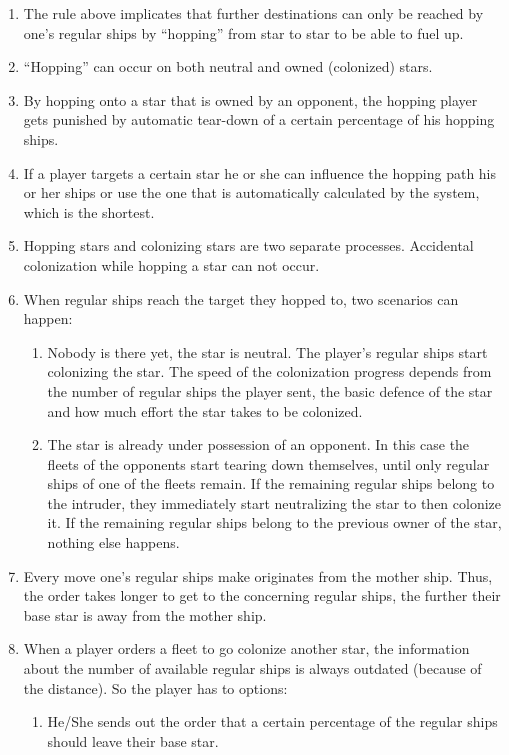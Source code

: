 \begin{enumerate}
	\item The rule above implicates	that further destinations can only be reached by one's regular ships by ``hopping'' from star to star to be able to fuel up.
	\item ``Hopping'' can occur on both neutral and owned (colonized) stars.
	\item By hopping onto a star that is owned by an opponent, the hopping player gets punished by automatic tear-down of a certain percentage of his hopping ships.
	\item If a player targets a certain star he or she can influence the hopping path his or her ships or use the one that is automatically calculated by the system, which is the shortest.
	\item Hopping stars and colonizing stars are two separate processes. Accidental colonization while hopping a star can not occur.
	\item When regular ships reach the target they hopped to, two scenarios can happen:
		\begin{enumerate}[label=\alph*)]
			\item Nobody is there yet, the star is neutral. The player's regular ships start colonizing the star. The speed of the colonization progress depends from the number of regular ships the player sent, the basic defence of the star and how much effort the star takes to be colonized.
			\item The star is already under possession of an opponent. In this case the fleets of the opponents start tearing down themselves, until only regular ships of one of the fleets remain. If the remaining regular ships belong to the intruder, they immediately start neutralizing the star to then colonize it. If the remaining regular ships belong to the previous owner of the star, nothing else happens.
		\end{enumerate}
		\item Every move one's regular ships make originates from the mother ship. Thus, the order takes longer to get to the concerning regular ships, the further their base star is away from the mother ship.
	\item When a player orders a fleet to go colonize another star, the information about the number of available regular ships is always outdated (because of the distance). So the player has to options:
		\begin{enumerate}[label=\alph*)]
			\item He/She sends out the order that a certain percentage of the regular ships should leave their base star.

\end{enumerate}
\end{enumerate}
